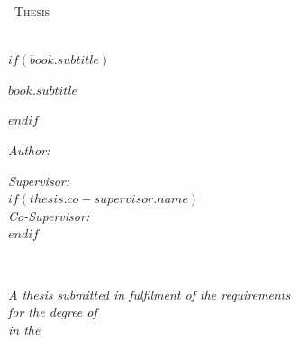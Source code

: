
\pagestyle{plain}


\begin{titlepage}
\begin{center}

\vspace*{.03\textheight}
{\scshape\large \univname\par}\vspace{0.8cm}
\textsc{\normalsize \degreename\ Thesis}\\[0.4cm]

\HRule\\[0.3cm]
{\Large\bfseries \ttitle\par}\vspace{0.2cm}
$if(book.subtitle)$
{\large\bfseries $book.subtitle$\par}\vspace{0.2cm}
$endif$
\HRule\\[0.8cm]

\begin{minipage}[t]{0.4\textwidth}
\begin{flushleft}\normalsize
\emph{Author:}\\
\authorname
\end{flushleft}
\end{minipage}
\begin{minipage}[t]{0.4\textwidth}
\begin{flushright}\normalsize
\emph{Supervisor:}\\
\supname
$if(thesis.co-supervisor.name)$
\\[0.3cm]
\emph{Co-Supervisor:}\\
\cosupname
$endif$
\end{flushright}
\end{minipage}\\[1.2cm]

\vfill

\small\textit{A thesis submitted in fulfilment of the requirements\\for the degree of \degreename}\\[0.2cm]
\textit{in the}\\[0.2cm]
\groupname\\
\deptname\\[0.8cm]


\end{center}
\end{titlepage}
